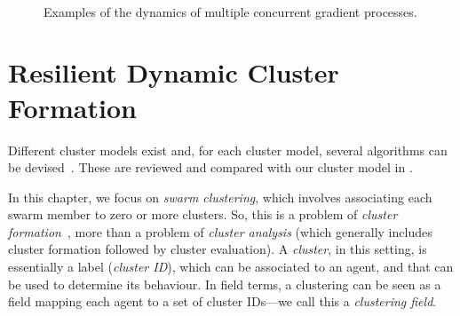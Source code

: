\begin{figure}
%
\\
%
%
\caption{Examples of the dynamics of multiple concurrent gradient processes.}
\label{fig:spawn-dynamics}
\end{figure}


\section{Resilient Dynamic Cluster Formation}
\label{s:background-clustering}

Different cluster models exist
 and, for each cluster model, several algorithms can be devised~\cite{DBLP:journals/sigkdd/Estivill-Castro02}.
%
These are reviewed and compared with our cluster model in .

In this chapter, we focus on \emph{swarm clustering},
 which involves associating each swarm member
 to zero or more clusters.
%
So, this is a problem of \emph{cluster formation}~\cite{DBLP:journals/tie/GeHZ18},
 more than a problem of \emph{cluster analysis} (which generally includes cluster formation followed by cluster evaluation).
%
A \emph{cluster}, in this setting,
 is essentially a label (\emph{cluster ID}),
 which can be associated to an agent,
 and that can be used to determine its behaviour.
%
In field terms,
 a clustering can be seen as a field
 mapping each agent to
 a set of cluster IDs---we call this a \emph{clustering field}.


